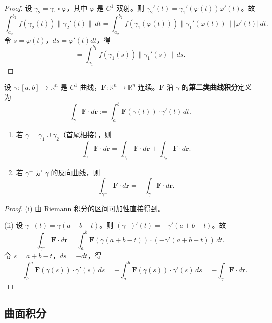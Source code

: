 \begin{proof}
设 $\gamma_2 = \gamma_1 \circ \varphi$，其中 $\varphi$ 是 $C^1$ 双射。则 $\gamma_2'(t) = \gamma_1'(\varphi(t)) \varphi'(t)$。故
\[
\int_{a_2}^{b_2} f(\gamma_2(t)) \|\gamma_2'(t)\| \, dt = \int_{a_2}^{b_2} f(\gamma_1(\varphi(t))) \|\gamma_1'(\varphi(t))\| |\varphi'(t)| \, dt.
\]
令 $s = \varphi(t)$，$ds = \varphi'(t) dt$，得
\[
= \int_{a_1}^{b_1} f(\gamma_1(s)) \|\gamma_1'(s)\| \, ds.
\]
\end{proof}

\begin{definition}\label{def:line_integral_second_kind}
设 $\gamma: [a, b] \to \mathbb{R}^n$ 是 $C^1$ 曲线，$\mathbf{F}: \mathbb{R}^n \to \mathbb{R}^n$ 连续。$\mathbf{F}$ 沿 $\gamma$ 的\textbf{第二类曲线积分}定义为
\[
\int_\gamma \mathbf{F} \cdot d\mathbf{r} := \int_a^b \mathbf{F}(\gamma(t)) \cdot \gamma'(t) \, dt.
\]
\end{definition}

\begin{proposition}[第二类曲线积分的可加性与反向性]\label{prop:line_integral_second_kind_properties}
\begin{enumerate}[label=(\roman*)]
    \item 若 $\gamma = \gamma_1 \cup \gamma_2$（首尾相接），则
    \[
    \int_\gamma \mathbf{F} \cdot d\mathbf{r} = \int_{\gamma_1} \mathbf{F} \cdot d\mathbf{r} + \int_{\gamma_2} \mathbf{F} \cdot d\mathbf{r}.
    \]
    \item 若 $\gamma^-$ 是 $\gamma$ 的反向曲线，则
    \[
    \int_{\gamma^-} \mathbf{F} \cdot d\mathbf{r} = -\int_\gamma \mathbf{F} \cdot d\mathbf{r}.
    \]
\end{enumerate}
\end{proposition}

\begin{proof}
(i) 由 Riemann 积分的区间可加性直接得到。

(ii) 设 $\gamma^-(t) = \gamma(a + b - t)$。则 $(\gamma^-)'(t) = -\gamma'(a + b - t)$。故
\[
\int_{\gamma^-} \mathbf{F} \cdot d\mathbf{r} = \int_a^b \mathbf{F}(\gamma(a + b - t)) \cdot (-\gamma'(a + b - t)) \, dt.
\]
令 $s = a + b - t$，$ds = -dt$，得
\[
= \int_b^a \mathbf{F}(\gamma(s)) \cdot \gamma'(s) \, ds = -\int_a^b \mathbf{F}(\gamma(s)) \cdot \gamma'(s) \, ds = -\int_\gamma \mathbf{F} \cdot d\mathbf{r}.
\]
\end{proof}

\subsection{曲面积分}

